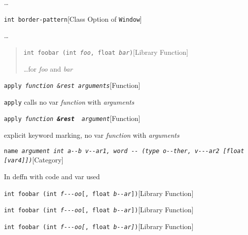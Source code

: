 \documentclass{book}
\begin{document}
%
\dots{}\@

\noindent\texttt{\texttt{int} border-pattern}\hfill[Class Option of \texttt{Window}]



%
\dots{}\@

\begin{quote}
\noindent\texttt{int foobar (int \textsl{foo}, float \textsl{bar})}\hfill[Library Function]



%
\dots{}\@ for \textsl{foo} and \textsl{bar}
\end{quote}

\noindent\texttt{apply \EmbracOn{}\textsl{function \&rest arguments}}\hfill[Function]



%
\texttt{apply} calls no var \textsl{function} with \textsl{arguments}

\noindent\texttt{apply \EmbracOn{}\textsl{function \EmbracOff{}\textnormal{\textbf{\&rest }}\EmbracOn{} argument}}\hfill[Function]



%
explicit keyword marking, no var \textsl{function} with \textsl{arguments}

\noindent\texttt{name \EmbracOn{}\textsl{argument \EmbracOff{}\texttt{int}\EmbracOn{} \EmbracOff{}\texttt{a{-}{-}b}\EmbracOn{} \EmbracOff{}\textsl{v{-}{-}ar1}\EmbracOn{}, word \EmbracOff{}\texttt{{-}{-}}\EmbracOn{} (\EmbracOff{}\texttt{type o{-}{-}ther}\EmbracOn{}, \EmbracOff{}\textsl{v{-}{-}{-}ar2}\EmbracOn{}  [\EmbracOff{}\texttt{float}\EmbracOn{} [\EmbracOff{}\textsl{var4}\EmbracOn{}]])}}\hfill[Category]



%
In deffn with code and var used

\noindent\texttt{int foobar (int \textsl{f{-}{-}{-}oo}[, float \textsl{b{-}{-}ar}])}\hfill[Library Function]



%
\noindent\texttt{int foobar (int \textsl{f{-}{-}{-}oo}\textnormal{[}, float \textsl{b{-}{-}ar}\textnormal{]})}\hfill[Library Function]



%
\noindent\texttt{int foobar (int \textsl{f{-}{-}{-}oo}\textsl{[}, float \textsl{b{-}{-}ar}\textsl{]})}\hfill[Library Function]
\end{document}
